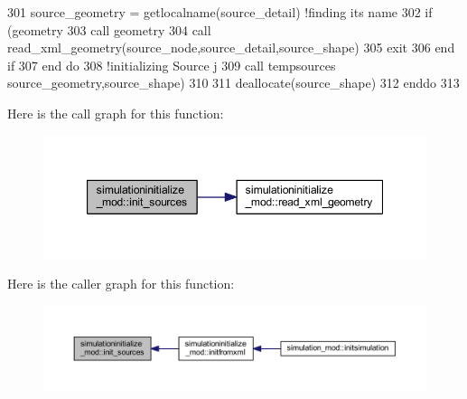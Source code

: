 \begin{DoxyCode}
301             source\_geometry = getlocalname(source\_detail)  \textcolor{comment}{!finding its name}
302             \textcolor{keywordflow}{if} (geometry%
303                 \textcolor{keyword}{call }geometry%
304                 \textcolor{keyword}{call }read\_xml\_geometry(source\_node,source\_detail,source\_shape)
305                 \textcolor{keywordflow}{exit}
306 \textcolor{keywordflow}{            end if}
307 \textcolor{keywordflow}{        end do}
308         \textcolor{comment}{!initializing Source j}
309         \textcolor{keyword}{call }tempsources%
      source\_geometry,source\_shape)
310 
311         \textcolor{keyword}{deallocate}(source\_shape)
312 \textcolor{keywordflow}{    enddo}
313 
\end{DoxyCode}
Here is the call graph for this function\+:\nopagebreak
\begin{figure}[H]
\begin{center}
\leavevmode
\includegraphics[width=347pt]{namespacesimulationinitialize__mod_acaa6b217159e3a10e7db04dd7b0e4058_cgraph}
\end{center}
\end{figure}
Here is the caller graph for this function\+:\nopagebreak
\begin{figure}[H]
\begin{center}
\leavevmode
\includegraphics[width=350pt]{namespacesimulationinitialize__mod_acaa6b217159e3a10e7db04dd7b0e4058_icgraph}
\end{center}
\end{figure}
\mbox{\label{namespacesimulationinitialize__mod_ada0310fe0d45fa2eec30deaf3ad25ba7}} 
